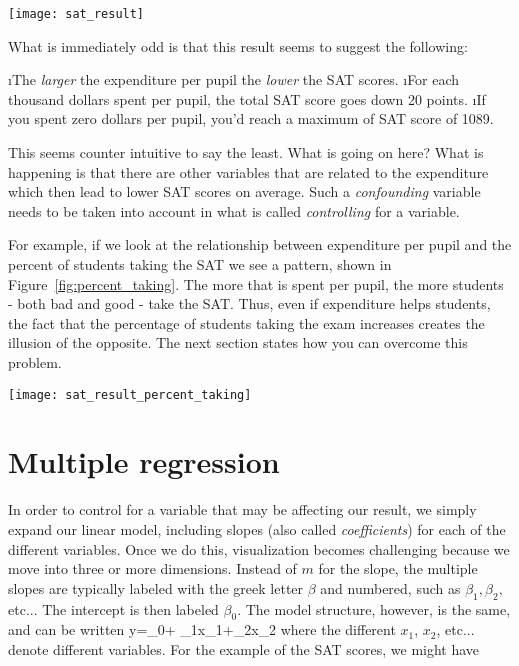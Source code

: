 \begin{figure*}
\texttt{[image: sat\_result]}
\caption{Total SAT score vs expenditure (top) and the distributions for the slope (bottom left) and intercept (bottom right).}\label{fig:sat}
\end{figure*}

What is immediately odd is that this result seems to suggest the following:

\be
\i The \emph{larger} the expenditure per pupil the \emph{lower} the SAT scores.
\i For each thousand dollars spent per pupil, the total SAT score goes down 20 points.
\i If you spent zero dollars per pupil, you'd reach a maximum of SAT score of 1089.
\ee

This seems counter intuitive to say the least.  What is going on here?   What is happening is that there are other variables that are related to the expenditure which then lead to lower SAT scores on average.  Such a \emph{confounding} variable needs to be taken into account in what is called \emph{controlling} for a variable.

For example, if we look at the relationship between expenditure per pupil and the percent of students taking the SAT we see a pattern, shown in Figure~\ref{fig:percent_taking}.  The more that is spent per pupil, the more students - both bad and good - take the SAT.  Thus, even if expenditure helps students, the fact that the percentage of students taking the exam increases creates the illusion of the opposite. The next section states how you can overcome this problem.


\begin{figure*}
\texttt{[image: sat\_result\_percent\_taking]}
\caption{Percent of students taking the SAT vs per pupil expenditure (top) and the distributions for the slope (bottom left) and intercept (bottom right).}\label{fig:percent_taking}
\end{figure*}


\section{Multiple regression}

In order to control for a variable that may be affecting our result, we simply expand our linear model, including slopes (also called \emph{coefficients}) for each of the different variables.  Once we do this, visualization becomes challenging because we move into three or more dimensions.   Instead of $m$ for the slope, the multiple slopes are typically labeled with the greek letter $\beta$ and numbered, such as $\beta_{1}, \beta_{2},$ etc...  The intercept is then labeled $\beta_{0}$.  The model structure, however, is the same, and can be written
\beqn
y=\beta_{0}+ \beta_{1}x_{1}+\beta_{2}x_{2} \cdots
\eeqn
where the different $x_{1}$, $x_{2}$, etc... denote different variables.  For the example of the SAT scores, we might have

